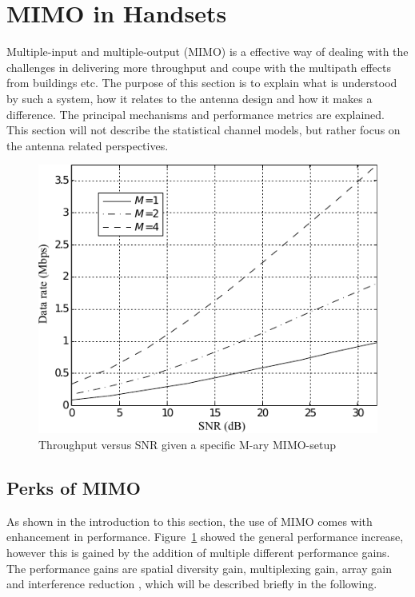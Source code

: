 \section{MIMO in Handsets}
\label{sec:mimo_in_handsets}
Multiple-input and multiple-output (MIMO) is a effective way of dealing with the challenges in delivering more throughput and coupe with the multipath effects from buildings etc. The purpose of this section is to explain what is understood by such a system, how it relates to the antenna design and how it makes a difference. The principal mechanisms and performance metrics are explained. This section will not describe the statistical channel models, but rather focus on the antenna related perspectives. 

\begin{figure}[htbp]
  \centering
  \includegraphics[scale=1.2]{img/analysis/datarateMimo}
  \caption{Throughput versus SNR given a specific M-ary MIMO-setup\cite{Ezio2007MIMO}}
  \label{fig:mimo-throughput}
\end{figure}

\subsection{Perks of MIMO} 
As shown in the introduction to this section, the use of MIMO comes with enhancement in performance. Figure~\ref{fig:mimo-throughput} showed the general performance increase, however this is gained by the addition of multiple different performance gains. The performance gains are spatial diversity gain, multiplexing gain, array gain and interference reduction \cite{Ezio2007MIMO}, which will be described briefly in the following.

